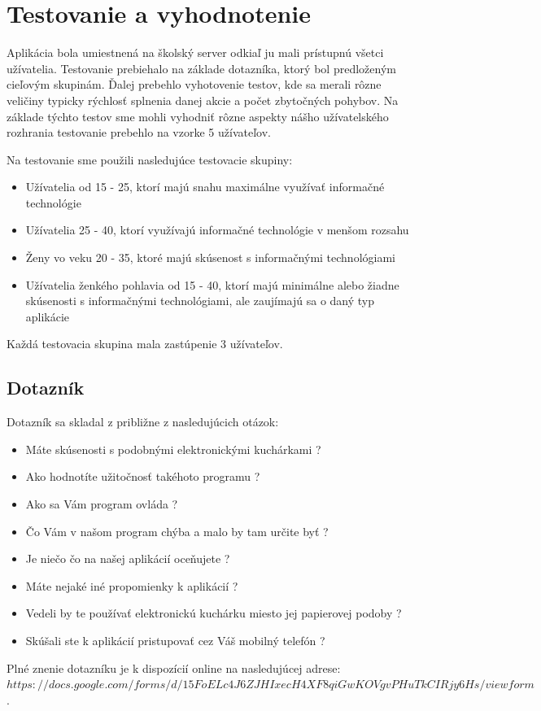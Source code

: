 \documentclass[12pt,a4paper,titlepage,final]{article}
\begin{document}
\section{Testovanie a vyhodnotenie}
Aplikácia bola umiestnená na školský server odkiaľ ju mali prístupnú všetci užívatelia. Testovanie prebiehalo na základe dotazníka, ktorý bol predloženým cieľovým skupinám. Ďalej prebehlo vyhotovenie testov, kde sa merali rôzne veličiny typicky rýchlosť splnenia danej akcie a počet zbytočných pohybov. Na základe týchto testov sme mohli vyhodniť rôzne aspekty nášho užívatelského rozhrania testovanie prebehlo na vzorke 5 užívateľov. 

Na testovanie sme použili nasledujúce testovacie skupiny:
\begin{itemize}
\item Užívatelia od 15 - 25, ktorí majú snahu maximálne využívať informačné technológie
\item Užívatelia 25 - 40, ktorí využívajú informačné technológie v menšom rozsahu
\item Ženy vo veku 20 - 35, ktoré majú skúsenost s informačnými technológiami
\item Užívatelia ženkého pohlavia od 15 - 40, ktorí majú minimálne alebo žiadne skúsenosti s informačnými technológiami, ale zaujímajú sa o daný typ aplikácie
\end{itemize}
Každá testovacia skupina mala zastúpenie 3 užívateľov.

\subsection{Dotazník}
Dotazník sa skladal z približne z nasledujúcich otázok:
\begin{itemize}
\item Máte skúsenosti s podobnými elektronickými kuchárkami ?
\item Ako hodnotíte užitočnosť takéhoto programu ?
\item Ako sa Vám program ovláda ?
\item Čo Vám v našom program chýba a malo by tam určite byť ?
\item Je niečo čo na našej aplikácií oceňujete ?
\item Máte nejaké iné propomienky k aplikácií ?
\item Vedeli by te používať elektronickú kuchárku miesto jej papierovej podoby ?
\item Skúšali ste k aplikácií pristupovať cez Váš mobilný telefón ?


\end{itemize}
Plné znenie dotazníku je k dispozícií online na nasledujúcej adrese:$https://docs.google.com/forms/d/15FoELc4J6ZJHIxecH4XF8qiGwKOVgvPHuTkCIRjy6Hs/viewform$. 
\end{document}
